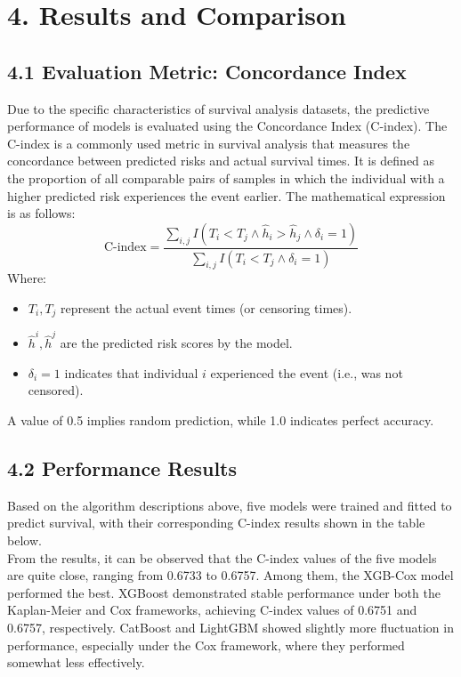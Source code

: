 \documentclass[11pt]{article}
\begin{document}
\section*{4. Results and Comparison}
\subsection*{4.1 Evaluation Metric: Concordance Index}
Due to the specific characteristics of survival analysis datasets, the predictive performance of models is evaluated using the Concordance Index (C-index). The C-index is a commonly used metric in survival analysis that measures the concordance between predicted risks and actual survival times. It is defined as the proportion of all comparable pairs of samples in which the individual with a higher predicted risk experiences the event earlier. The mathematical expression is as follows:
\[
\text{C-index} = \frac{\sum_{i,j} I(T_i < T_j \land \hat{h}_i > \hat{h}_j \land \delta_i = 1)}{\sum_{i,j} I(T_i < T_j \land \delta_i = 1)}
\]
\noindent
Where: \\
\begin{itemize}
    \item $T_i, T_j$ represent the actual event times (or censoring times).
    \item $\hat{h}^i, \hat{h}^j$ are the predicted risk scores by the model.
    \item $\delta_i = 1$ indicates that individual $i$ experienced the event (i.e., was not censored).
\end{itemize}

\noindent A value of 0.5 implies random prediction, while 1.0 indicates perfect accuracy.

\subsection*{4.2 Performance Results}
Based on the algorithm descriptions above, five models were trained and fitted to predict survival, with their corresponding C-index results shown in the table below. \\
\noindent From the results, it can be observed that the C-index values of the five models are quite close, ranging from 0.6733 to 0.6757. Among them, the XGB-Cox model performed the best. XGBoost demonstrated stable performance under both the Kaplan-Meier and Cox frameworks, achieving C-index values of 0.6751 and 0.6757, respectively. CatBoost and LightGBM showed slightly more fluctuation in performance, especially under the Cox framework, where they performed somewhat less effectively.
\end{document}
